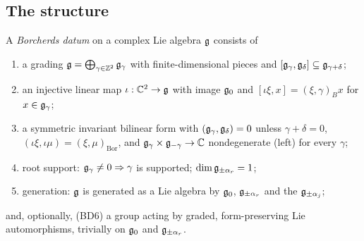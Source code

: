 \subsection{The structure}

\begin{definition}\label{ch18:def:bd}
A \emph{Borcherds datum} on a complex Lie algebra $\mathfrak{g}$ consists of
\begin{enumerate}[label=(BD\arabic*)]
\item a grading $\mathfrak{g}=\bigoplus_{\gamma\in{\mathbb{Z}}^2}\mathfrak{g}_\gamma$ with finite-dimensional pieces and $[\mathfrak{g}_\gamma,\mathfrak{g}_\delta]\subseteq\mathfrak{g}_{\gamma+\delta}$;
\item an injective linear map $\iota:\mathbb C^2\to\mathfrak{g}$ with image $\mathfrak{g}_0$ and $[\iota\xi,x]=(\xi,\gamma)_Bx$ for $x\in\mathfrak{g}_\gamma$;
\item a symmetric invariant bilinear form with $(\mathfrak{g}_\gamma,\mathfrak{g}_\delta)=0$ unless $\gamma+\delta=0$, $(\iota\xi,\iota\mu)=(\xi,\mu)_{\mathrm{Bor}}$, and
  $\mathfrak{g}_\gamma\times\mathfrak{g}_{-\gamma}\to\mathbb C$ nondegenerate (left) for every $\gamma$;
\item root support: $\mathfrak{g}_\gamma\neq0\Rightarrow\gamma$ is supported; $\dim\mathfrak{g}_{\pm\alpha_r}=1$;
\item generation: $\mathfrak{g}$ is generated as a Lie algebra by $\mathfrak{g}_0$, $\mathfrak{g}_{\pm\alpha_r}$ and the $\mathfrak{g}_{\pm\alpha_j}$;
\end{enumerate}
and, optionally, (BD6) a group acting by graded, form-preserving Lie automorphisms, trivially on $\mathfrak{g}_0$ and $\mathfrak{g}_{\pm\alpha_r}$.
\end{definition}
